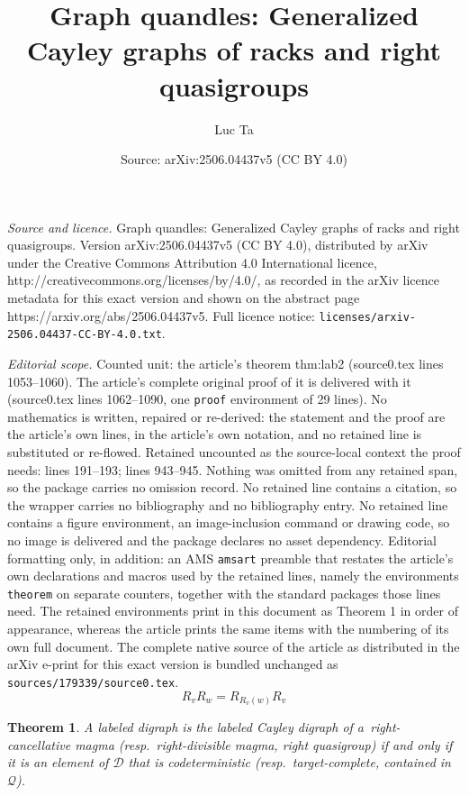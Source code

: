 \documentclass[10pt,a4paper]{amsart}
\title{Graph quandles: Generalized Cayley graphs of racks and right quasigroups}
\author{Luc Ta}
\date{Source: arXiv:2506.04437v5 (CC BY 4.0)}
\newtheorem{theorem}{Theorem}
\begin{document}
\maketitle

\noindent\emph{Source and licence.} Graph quandles: Generalized Cayley graphs of racks and right quasigroups. Version arXiv:2506.04437v5 (CC BY 4.0), distributed by arXiv under the Creative Commons Attribution 4.0 International licence, http://creativecommons.org/licenses/by/4.0/, as recorded in the arXiv licence metadata for this exact version and shown on the abstract page https://arxiv.org/abs/2506.04437v5. Full licence notice: \texttt{licenses/arxiv-2506.04437-CC-BY-4.0.txt}.\par\smallskip

\noindent\textit{Editorial scope.} Counted unit: the article's theorem thm:lab2 (source0.tex lines 1053--1060). The article's complete original proof of it is delivered with it (source0.tex lines 1062--1090, one \texttt{proof} environment of 29 lines). No mathematics is written, repaired or re-derived: the statement and the proof are the article's own lines, in the article's own notation, and no retained line is substituted or re-flowed.  Retained uncounted as the source-local context the proof needs: lines 191--193; lines 943--945.  Nothing was omitted from any retained span, so the package carries no omission record.  No retained line contains a citation, so the wrapper carries no bibliography and no bibliography entry.  No retained line contains a figure environment, an image-inclusion command or drawing code, so no image is delivered and the package declares no asset dependency.  Editorial formatting only, in addition: an AMS \texttt{amsart} preamble that restates the article's own declarations and macros used by the retained lines, namely the environments \texttt{theorem} on separate counters, together with the standard packages those lines need.  The retained environments print in this document as Theorem 1 in order of appearance, whereas the article prints the same items with the numbering of its own full document.  The complete native source of the article as distributed in the arXiv e-print for this exact version is bundled unchanged as \texttt{sources/179339/source0.tex}.
			\begin{equation}\label{eq:rack}
				R_v R_w = R_{R_v (w)}R_v
			\end{equation}

	\begin{theorem}\label{thm:lab1}
		A labeled digraph is the labeled Cayley digraph of a~right-cancellative magma \textup{(}resp.\ right-divisible magma, right quasigroup\textup{)} if and only if it is an element of $\mathcal{D}$ that is codeterministic \textup{(}resp.\ target-complete, contained in $\mathcal{Q}$\textup{)}.
	\end{theorem}
\end{document}
